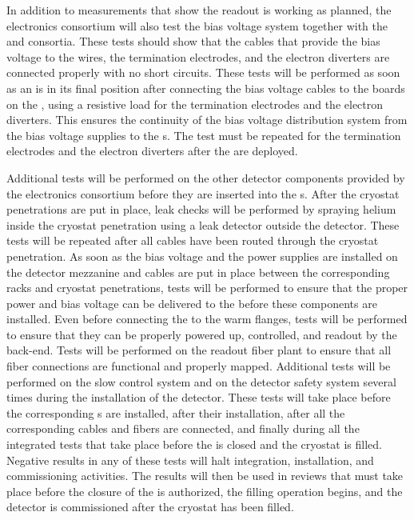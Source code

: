 In addition to measurements that show the 
readout is working as planned, the  electronics consortium will also
test the bias voltage system together with the 
and  consortia. These tests should show that
the cables that provide the bias voltage to the  wires, the
 termination electrodes, and the electron diverters are connected
properly with no short circuits. %
These tests will be performed as soon as an 
is in its final position after connecting the bias voltage cables to the 
 boards on the , using a resistive load for the 
 termination electrodes and the electron diverters. This ensures
the continuity of the bias voltage distribution system from the bias voltage
supplies to the s. The test must be repeated for the 
termination electrodes and the electron diverters after 
the  are deployed.

Additional tests will be performed on the other detector components
provided by the  electronics consortium before they are inserted into the
s. After the cryostat penetrations are put in place, leak checks
will be performed by spraying helium inside the cryostat penetration using 
a leak detector outside the detector. These tests will be repeated 
after all cables have been routed through the cryostat penetration.
As soon as the bias voltage and the power supplies are installed on the detector
mezzanine and cables are put in place between the corresponding racks and
cryostat penetrations, tests will be performed to ensure that the proper 
power and bias voltage can be delivered to the  before these components
are installed. Even before connecting the  to the warm flanges,
tests will be performed to ensure that they can be properly powered up, controlled,
and readout by the  back-end. Tests will be performed on the
readout fiber plant to ensure that all fiber connections are functional
and properly mapped. Additional tests will be performed on the slow control
system and on the detector safety system several times during the
installation of the detector. These tests will take place before the
corresponding s are installed, after their installation, after
all the corresponding cables and fibers are connected, and finally
during all the integrated tests that take place before
the  is closed and the cryostat is filled. Negative results in any
of these tests will halt integration, installation, and
commissioning activities. The results will then be used in reviews that must
take place before the closure of the  is authorized, the  filling operation begins, and the detector is
commissioned after the cryostat has been filled.

